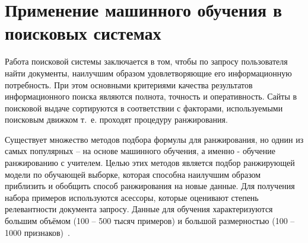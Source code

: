 \section{Применение машинного обучения в поисковых системах}

Работа поисковой системы заключается в том, чтобы по запросу пользователя найти документы, наилучшим образом удовлетворяющие его информационную потребность. При этом основными критериями качества результатов информационного поиска являются полнота, точность и оперативность. Сайты в поисковой выдаче сортируются в соответствии с факторами, используемыми поисковым движком т.~е. проходят процедуру ранжирования.

Существует множество методов подбора формулы для ранжирования, но однин из самых популярных -- на основе машинного обучения, а именно -  обучение ранжированию с учителем. Целью этих методов является подбор ранжирующей модели по обучающей выборке, которая способна наилучшим образом приблизить и обобщить способ ранжирования на новые данные. Для получения набора примеров используются асессоры, которые оценивают степень релевантности документа запросу. Данные для обучения характеризуются большим объёмом (100 -- 500 тысяч примеров) и большой размерностью (100 -- 1000 признаков)~\cite{ML_for_rank}.

